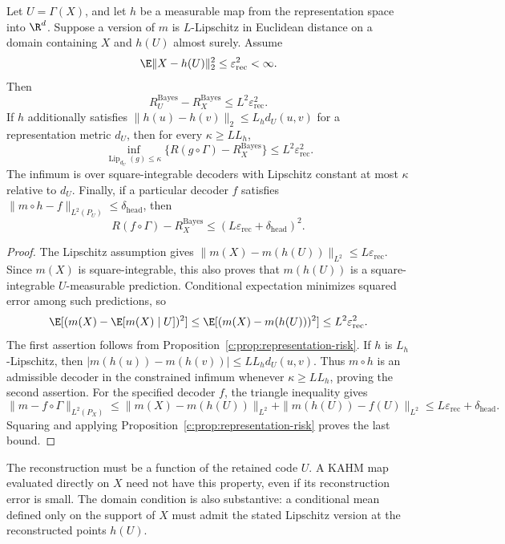 \begin{proposition}
\label{c:prop:reconstruction-bridge}
Let $U=\Gamma(X)$, and let $h$ be a measurable map from the representation
space into $\R^d$. Suppose a version of $m$ is $L$-Lipschitz in Euclidean
distance on a domain containing $X$ and $h(U)$ almost surely. Assume
\[
 \E\|X-h(U)\|_2^2\leq\varepsilon_{\mathrm{rec}}^2<\infty.
\]
Then
\[
 R_U^{\mathrm{Bayes}}-R_X^{\mathrm{Bayes}}
 \leq L^2\varepsilon_{\mathrm{rec}}^2.
\]
If $h$ additionally satisfies
$\|h(u)-h(v)\|_2\leq L_h d_U(u,v)$ for a representation metric $d_U$,
then for every $\kappa\geq LL_h$,
\[
 \inf_{\operatorname{Lip}_{d_U}(g)\leq\kappa}
 \{R(g\circ\Gamma)-R_X^{\mathrm{Bayes}}\}
 \leq L^2\varepsilon_{\mathrm{rec}}^2.
\]
The infimum is over square-integrable decoders with Lipschitz constant at
most $\kappa$ relative to $d_U$. Finally, if a particular decoder $f$
satisfies
$\|m\circ h-f\|_{L^2(P_U)}\leq\delta_{\mathrm{head}}$, then
\[
 R(f\circ\Gamma)-R_X^{\mathrm{Bayes}}
 \leq(L\varepsilon_{\mathrm{rec}}+\delta_{\mathrm{head}})^2.
\]
\end{proposition}
\begin{proof}
The Lipschitz assumption gives
$\|m(X)-m(h(U))\|_{L^2}\leq L\varepsilon_{\mathrm{rec}}$.
Since $m(X)$ is square-integrable, this also proves that $m(h(U))$ is
a square-integrable $U$-measurable prediction. Conditional expectation
minimizes squared error among such predictions, so
\[
 \E[(m(X)-\E[m(X)\mid U])^2]
 \leq\E[(m(X)-m(h(U)))^2]
 \leq L^2\varepsilon_{\mathrm{rec}}^2.
\]
The first assertion follows from
Proposition~\ref{c:prop:representation-risk}. If $h$ is $L_h$-Lipschitz,
then
$|m(h(u))-m(h(v))|\leq LL_h d_U(u,v)$.
Thus $m\circ h$ is an admissible decoder in the constrained infimum
whenever $\kappa\geq LL_h$, proving the second assertion. For the
specified decoder $f$, the triangle inequality gives
\[
 \|m-f\circ\Gamma\|_{L^2(P_X)}
 \leq\|m(X)-m(h(U))\|_{L^2}
      +\|m(h(U))-f(U)\|_{L^2}
 \leq L\varepsilon_{\mathrm{rec}}+\delta_{\mathrm{head}}.
\]
Squaring and applying Proposition~\ref{c:prop:representation-risk}
proves the last bound.
\end{proof}

The reconstruction must be a function of the retained code $U$. A KAHM
map evaluated directly on $X$ need not have this property, even if its
reconstruction error is small. The domain condition is also substantive:
a conditional mean defined only on the support of $X$ must admit the
stated Lipschitz version at the reconstructed points $h(U)$.

